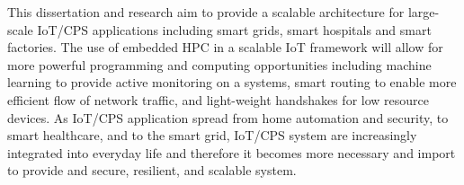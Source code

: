 \documentclass[../main.tex]{subfiles}
\begin{document}

This dissertation and research aim to provide a scalable architecture for large-scale IoT/CPS applications including smart grids, smart hospitals and smart factories. The use of embedded HPC in a scalable IoT framework will allow for more powerful programming and computing opportunities including machine learning to provide active monitoring on a systems, smart routing to enable more efficient flow of network traffic, and light-weight handshakes for low resource devices. As IoT/CPS application spread from home automation and security, to smart healthcare, and to the smart grid, IoT/CPS system are increasingly integrated into everyday life and therefore it becomes more necessary and import to provide and secure, resilient, and scalable system.


%
%
\end{document}
